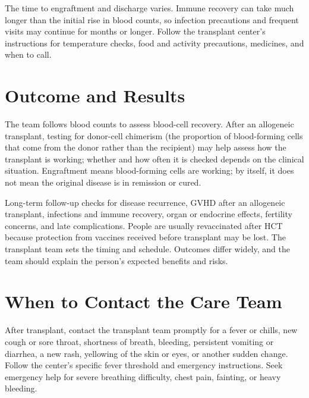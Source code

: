 The time to engraftment and discharge varies. Immune recovery can take much longer than the initial rise in blood counts, so infection precautions and frequent visits may continue for months or longer. Follow the transplant center's instructions for temperature checks, food and activity precautions, medicines, and when to call.

\section*{Outcome and Results}
The team follows blood counts to assess blood-cell recovery. After an allogeneic transplant, testing for donor-cell chimerism (the proportion of blood-forming cells that come from the donor rather than the recipient) may help assess how the transplant is working; whether and how often it is checked depends on the clinical situation. Engraftment means blood-forming cells are working; by itself, it does not mean the original disease is in remission or cured.

Long-term follow-up checks for disease recurrence, GVHD after an allogeneic transplant, infections and immune recovery, organ or endocrine effects, fertility concerns, and late complications. People are usually revaccinated after HCT because protection from vaccines received before transplant may be lost. The transplant team sets the timing and schedule. Outcomes differ widely, and the team should explain the person's expected benefits and risks.

\section*{When to Contact the Care Team}
After transplant, contact the transplant team promptly for a fever or chills, new cough or sore throat, shortness of breath, bleeding, persistent vomiting or diarrhea, a new rash, yellowing of the skin or eyes, or another sudden change. Follow the center's specific fever threshold and emergency instructions. Seek emergency help for severe breathing difficulty, chest pain, fainting, or heavy bleeding.

